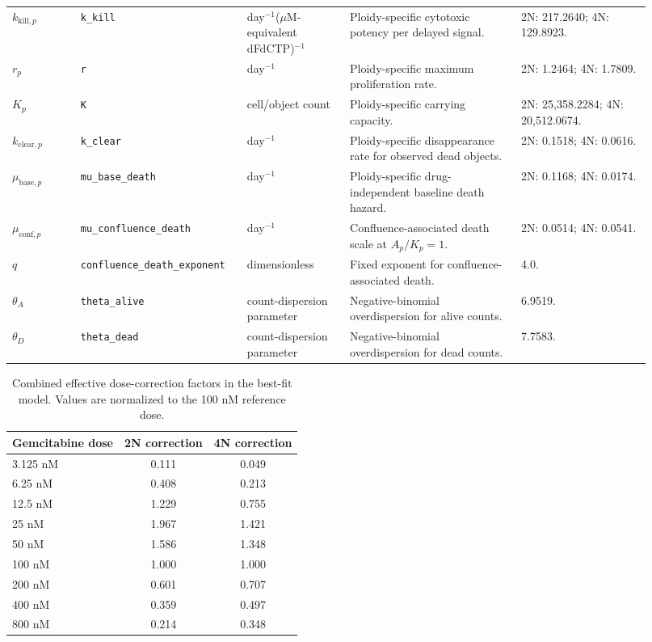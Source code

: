 \documentclass[11pt,notitlepage]{article}
\begin{document}
\begin{table}[ht]
\begin{tabular}{p{0.1\linewidth}p{0.23\linewidth}p{0.15\linewidth}p{0.25\linewidth}p{0.19\linewidth}}
$k_{\mathrm{kill},p}$ & \texttt{k\_kill} & day$^{-1}$($\mu$M-equivalent dFdCTP)$^{-1}$ & Ploidy-specific cytotoxic potency per delayed signal. & 2N: 217.2640; 4N: 129.8923. \\
$r_p$ & \texttt{r} & day$^{-1}$ & Ploidy-specific maximum proliferation rate. & 2N: 1.2464; 4N: 1.7809. \\
$K_p$ & \texttt{K} & cell/object count & Ploidy-specific carrying capacity. & 2N: 25,358.2284; 4N: 20,512.0674. \\
$k_{\mathrm{clear},p}$ & \texttt{k\_clear} & day$^{-1}$ & Ploidy-specific disappearance rate for observed dead objects. & 2N: 0.1518; 4N: 0.0616. \\
$\mu_{\mathrm{base},p}$ & \texttt{mu\_base\_death} & day$^{-1}$ & Ploidy-specific drug-independent baseline death hazard. & 2N: 0.1168; 4N: 0.0174. \\
$\mu_{\mathrm{conf},p}$ & \texttt{mu\_confluence\_death} & day$^{-1}$ & Confluence-associated death scale at $A_p/K_p=1$. & 2N: 0.0514; 4N: 0.0541. \\
$q$ & \texttt{confluence\_death\_exponent} & dimensionless & Fixed exponent for confluence-associated death. & 4.0. \\
$\theta_A$ & \texttt{theta\_alive} & count-dispersion parameter & Negative-binomial overdispersion for alive counts. & 6.9519. \\
$\theta_D$ & \texttt{theta\_dead} & count-dispersion parameter & Negative-binomial overdispersion for dead counts. & 7.7583. \\
  \hline
  \end{tabular}
  \end{table}



\color{blue}

\begin{table}[htbp!]
\centering
\caption{Combined effective dose-correction factors in the best-fit model. Values are normalized to the 100 nM reference dose.}
\label{tab:effective_dose_scaling}
\begin{tabular}{lcc}
\toprule
Gemcitabine dose & 2N correction & 4N correction \\
\midrule
3.125 nM & 0.111 & 0.049 \\
6.25 nM & 0.408 & 0.213 \\
12.5 nM & 1.229 & 0.755 \\
25 nM & 1.967 & 1.421 \\
50 nM & 1.586 & 1.348 \\
100 nM & 1.000 & 1.000 \\
200 nM & 0.601 & 0.707 \\
400 nM & 0.359 & 0.497 \\
800 nM & 0.214 & 0.348 \\
\bottomrule
\end{tabular}
\end{table}
\end{document}

